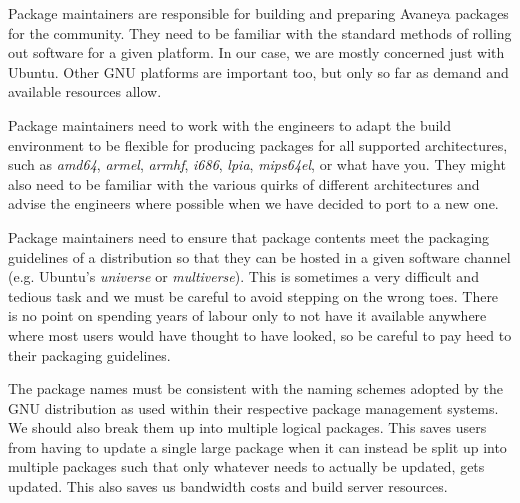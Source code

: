 
Package maintainers are responsible for building and preparing Avaneya packages for the community. They need to be familiar with the standard methods of rolling out software for a given platform. In our case, we are mostly concerned just with Ubuntu. Other GNU platforms are important too, but only so far as demand and available resources allow.

Package maintainers need to work with the engineers to adapt the build environment to be flexible for producing packages for all supported architectures, such as {\it amd64}, {\it armel}, {\it armhf}, {\it i686}, {\it lpia}, {\it mips64el}, or what have you. They might also need to be familiar with the various quirks of different architectures and advise the engineers where possible when we have decided to port to a new one.

Package maintainers need to ensure that package contents meet the packaging guidelines of a distribution so that they can be hosted in a given software channel (e.g. Ubuntu's {\it universe} or {\it multiverse}). This is sometimes a very difficult and tedious task and we must be careful to avoid stepping on the wrong toes. There is no point on spending years of labour only to not have it available anywhere where most users would have thought to have looked, so be careful to pay heed to their packaging guidelines.

The package names must be consistent with the naming schemes adopted by the GNU distribution as used within their respective package management systems. We should also break them up into multiple logical packages. This saves users from having to update a single large package when it can instead be split up into multiple packages such that only whatever needs to actually be updated, gets updated. This also saves us bandwidth costs and build server resources.



\StopChapter

